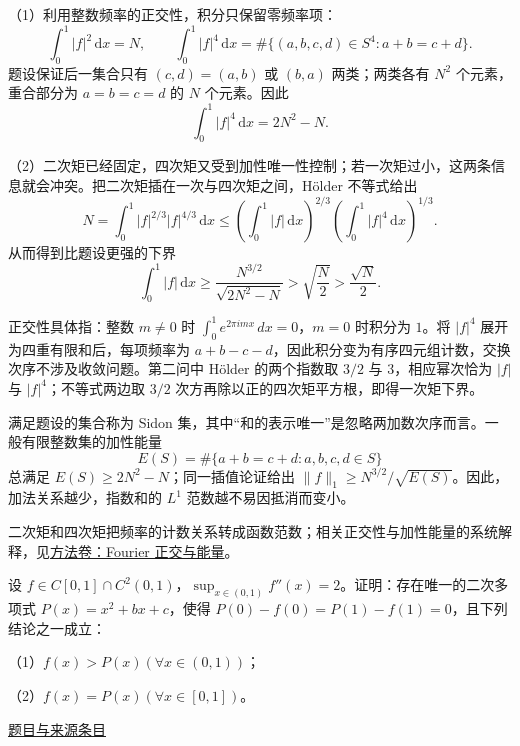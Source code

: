 \documentclass[12pt,fontset=fandol]{ctexart}
\begin{document}
\begin{solve}\label{ans:ch01-17th-A:2}

（1）利用整数频率的正交性，积分只保留零频率项：
\[
\int_0^1|f|^2\,\mathrm dx=N,\qquad
\int_0^1|f|^4\,\mathrm dx
=\#\{(a,b,c,d)\in S^4:a+b=c+d\}.
\]
题设保证后一集合只有 $(c,d)=(a,b)$ 或 $(b,a)$ 两类；两类各有 $N^2$ 个元素，重合部分为 $a=b=c=d$ 的 $N$ 个元素。因此
\[
\int_0^1|f|^4\,\mathrm dx=2N^2-N.
\]

（2）二次矩已经固定，四次矩又受到加性唯一性控制；若一次矩过小，这两条信息就会冲突。把二次矩插在一次与四次矩之间，Hölder 不等式给出
\[
N=\int_0^1 |f|^{2/3}|f|^{4/3}\,\mathrm dx
\leq\left(\int_0^1|f|\,\mathrm dx\right)^{2/3}
     \left(\int_0^1|f|^4\,\mathrm dx\right)^{1/3}.
\]
从而得到比题设更强的下界
\[
\int_0^1|f|\,\mathrm dx
\geq\frac{N^{3/2}}{\sqrt{2N^2-N}}
>\sqrt{\frac N2}>\frac{\sqrt N}{2}.
\]

正交性具体指：整数 $m\ne0$ 时 $\int_0^1e^{2\pi imx}\,dx=0$，$m=0$ 时积分为 $1$。将 $|f|^4$ 展开为四重有限和后，每项频率为 $a+b-c-d$，因此积分变为有序四元组计数，交换次序不涉及收敛问题。第二问中 Hölder 的两个指数取 $3/2$ 与 $3$，相应幂次恰为 $|f|$ 与 $|f|^4$；不等式两边取 $3/2$ 次方再除以正的四次矩平方根，即得一次矩下界。

\end{solve}

\begin{remark}[方法与条件]满足题设的集合称为 Sidon 集，其中“和的表示唯一”是忽略两加数次序而言。一般有限整数集的加性能量
\[
E(S)=\#\{a+b=c+d:a,b,c,d\in S\}
\]
总满足 $E(S)\geq2N^2-N$；同一插值论证给出 $\|f\|_1\geq N^{3/2}/\sqrt{E(S)}$。因此，加法关系越少，指数和的 $L^1$ 范数越不易因抵消而变小。

二次矩和四次矩把频率的计数关系转成函数范数；相关正交性与加性能量的系统解释，见\hyperref[app:integration-fourier]{方法卷：Fourier 正交与能量}。\end{remark}

\begin{example}[来源序号5]\label{ex:ch01-17th-A:5}\label{pr:ch01-17th-A:5}

设 $f \in C[0,1] \cap C^2(0,1)$，$\sup_{x \in (0,1)} f''(x) = 2$。证明：存在唯一的二次多项式 $P(x) = x^2 + bx + c$，使得 $P(0) - f(0) = P(1) - f(1) = 0$，且下列结论之一成立：

（1）$f(x) > P(x) (\forall x \in (0,1))$；

（2）$f(x) = P(x) (\forall x \in [0,1])$。

\par\href{https://github.com/lzxcr/cmc-mathematics/blob/64916fa1fdbc3e444a652eca204d5669058ee321/src/problems/preliminary/17/05.md}{题目与来源条目}

\end{example}
\end{document}
